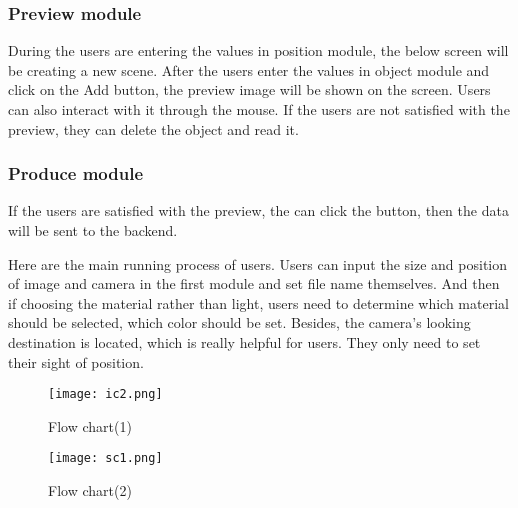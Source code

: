 \documentclass[11pt]{article}
\begin{document}
\subsubsection{Preview module}
During the users are entering the values in position module, the below screen will be creating a new scene. After the users enter the values in object module and click on the Add button, the preview image will be shown on the screen. Users can also interact with it through the mouse. If the users are not satisfied with the preview, they can delete the object and read it.

\subsubsection{Produce module}
If the users are satisfied with the preview, the can click the button, then the data will be sent to the backend.
\newpage

Here are the main running process of users. Users can input the size and position of image and camera in the first module and set file name themselves. And then if choosing the material rather than light, users need to determine which material should be selected, which color should be set. Besides, the camera's looking destination is located, which is really helpful for users. They only need to set their sight of position.
\begin{figure}[H]

\centering
\texttt{[image: ic2.png]}
\caption{Flow chart(1)}
\label{fig:label}
\end{figure}

\begin{figure}[H]

\centering
\texttt{[image: sc1.png]}
\caption{Flow chart(2)}
\label{fig:label}
\end{figure}
\end{document}
